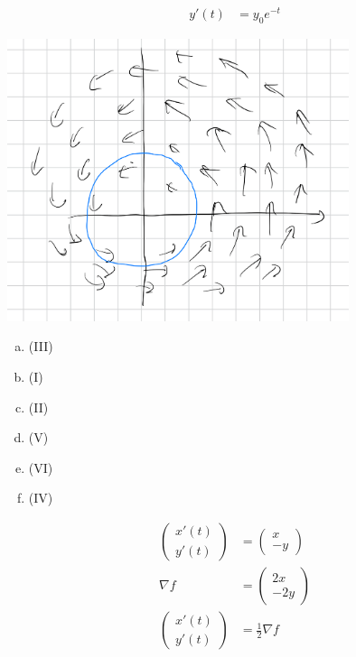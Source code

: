 \documentclass[8pt]{extarticle}
\begin{document}
\begin{problem}{17.4}
\begin{description}[font=\normalfont]
\begin{align*}
      y'(t) &= y_0e^{-t}
    \end{align*}
      \item[8:]\hfill
        \begin{center}
          \includegraphics[width=10cm]{images/17_4_8.png}
        \end{center}
      \item[16:]\hfill
        \begin{enumerate}[(a)]
          \item (III)
          \item (I)
          \item (II)
          \item (V)
          \item (VI)
          \item (IV)
        \end{enumerate}
      \item[20:]
        \begin{align*}
          \begin{pmatrix}x'(t)\\y'(t)\end{pmatrix}&= \begin{pmatrix}x\\-y\end{pmatrix}\\
          \nabla f &= \begin{pmatrix}2x\\-2y\end{pmatrix}\\
          \begin{pmatrix}x'(t)\\y'(t)\end{pmatrix}&= \frac{1}{2}\nabla f
        \end{align*}
    \end{description}
  \end{problem}
\end{document}
